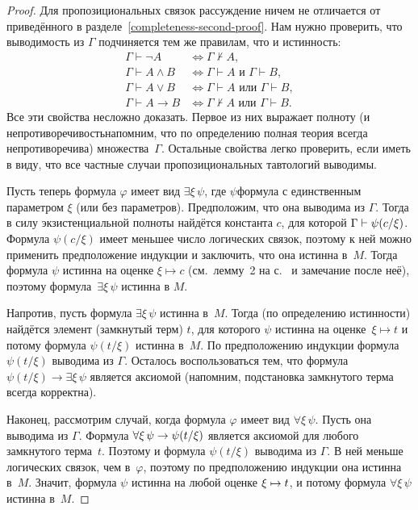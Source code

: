 \begin{proof}
Для пропозициональных связок рассуждение ничем не отличается от
приведённого в разделе~\ref{completeness-second-proof}. Нам
нужно проверить, что выводимость из $\Gamma$ подчиняется тем же
правилам, что и истинность:
        \begin{align*}
\Gamma\vdash \lnot A        & \Leftrightarrow  \Gamma\not\vdash A ,\\
\Gamma\vdash A\land B & \Leftrightarrow \Gamma\vdash A \text{ и }
                                        \Gamma\vdash B, \\
\Gamma\vdash A\lor B & \Leftrightarrow \Gamma\vdash A \text{ или }
                                        \Gamma\vdash B, \\
\Gamma\vdash A\to  B & \Leftrightarrow \Gamma\not\vdash A \text{ или }
                                        \Gamma\vdash B.
        \end{align*}
Все эти свойства несложно доказать. Первое из них выражает
полноту (и непротиворечивость\т напомним, что по определению
полная теория всегда непротиворечива) множества~$\Gamma$.
Остальные свойства легко проверить, если иметь в виду, что все
частные случаи пропозициональных тавтологий выводимы.

Пусть теперь формула $\varphi$ имеет вид $\exists \xi\,\psi$,
где $\psi$\т формула с единственным параметром $\xi$ (или без
параметров). Предположим, что она выводима из $\Gamma$. Тогда в
силу экзистенциальной полноты найдётся константа $c$, для
которой $\Gamma\hm\vdash \psi(c/\xi)$. Формула $\psi(c/\xi)$
имеет меньшее число логических связок, поэтому к ней можно
применить предположение индукции и заключить, что она истинна
в~$M$. Тогда формула $\psi$ истинна на оценке $\xi\mapsto c$
(см.~лемму~2 на с.~\pageref{trouble-lemma} и замечание после
неё), поэтому формула~$\exists\xi\,\psi$ истинна в $M$.

Напротив, пусть формула $\exists\xi\,\psi$ истинна в~$M$. Тогда
(по определению истинности) найдётся элемент (замкнутый терм)
$t$, для которого $\psi$ истинна на оценке~$\xi\mapsto t$ и
потому формула $\psi(t/\xi)$ истинна в~$M$. По предположению
индукции формула $\psi(t/\xi)$ выводима из $\Gamma$. Осталось
воспользоваться тем, что формула
$\psi(t/\xi)\to\exists\xi\,\psi$ является аксиомой (напомним,
подстановка замкнутого терма всегда корректна).

Наконец, рассмотрим случай, когда формула $\varphi$ имеет вид
$\forall\xi\,\psi$. Пусть она выводима из $\Gamma$. Формула
$\forall \xi\, \psi \hm\to \psi(t/\xi)$ является аксиомой для
любого замкнутого терма~$t$. Поэтому и формула $\psi(t/\xi)$
выводима из $\Gamma$. В ней меньше логических связок, чем
в~$\varphi$, поэтому по предположению индукции она истинна в~$M$.
Значит, формула $\psi$ истинна на любой оценке $\xi\hm\mapsto t$,
и потому формула $\forall\xi\,\psi$ истинна в~$M$.


\end{proof}
